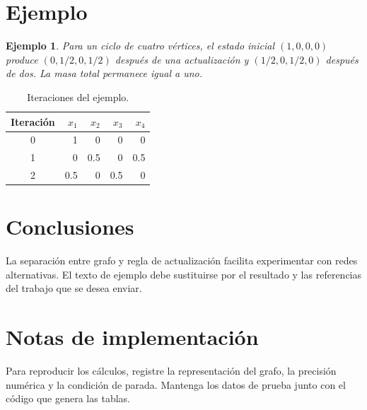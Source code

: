 \documentclass[11pt,a4paper]{article}
\newtheorem{example}{Ejemplo}
\begin{document}
\section{Ejemplo}
\begin{example}
Para un ciclo de cuatro vértices, el estado inicial $(1,0,0,0)$ produce
$(0,1/2,0,1/2)$ después de una actualización y $(1/2,0,1/2,0)$ después de
dos. La masa total permanece igual a uno.
\end{example}

\begin{table}[ht]
\centering
\caption{Iteraciones del ejemplo.}
\begin{tabular}{crrrr}
\toprule
Iteración & $x_1$ & $x_2$ & $x_3$ & $x_4$\\
\midrule
0 & 1 & 0 & 0 & 0\\
1 & 0 & 0.5 & 0 & 0.5\\
2 & 0.5 & 0 & 0.5 & 0\\
\bottomrule
\end{tabular}
\end{table}

\section{Conclusiones}
La separación entre grafo y regla de actualización facilita experimentar con
redes alternativas. El texto de ejemplo debe sustituirse por el resultado y
las referencias del trabajo que se desea enviar.

\appendix
\section{Notas de implementación}
Para reproducir los cálculos, registre la representación del grafo, la
precisión numérica y la condición de parada. Mantenga los datos de prueba junto
con el código que genera las tablas.
\end{document}
